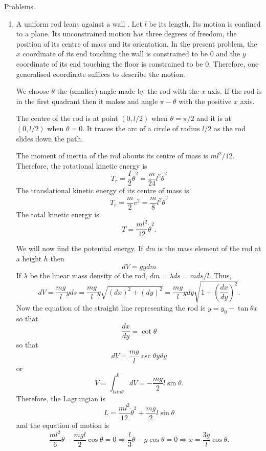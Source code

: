 Problems.
\begin{enumerate}
\item A uniform rod leans against a wall \cite[Problem 1, chapter 4]{akr}.
Let $l$ be its length. Its motion is confined to a plane. Its unconstrained
motion has three degrees of freedom, the position of its centre of mass and
its orientation. In the present problem, the $x$ coordinate of its end
touching the wall is constrained to be $0$ and the $y$ coordinate of its 
end touching the floor is constrained to be $0$. Therefore, one generalised
coordinate suffices to describe the motion. 

We choose $\theta$ the (smaller) angle made by the rod with the $x$ axis. If
the rod is in the first quadrant then it makes and angle $\pi -\theta$ with
the positive $x$ axis.

The centre of the rod is at point $(0, l/2)$ when $\theta = \pi/2$ and it is
at $(0, l/2)$ when $\theta = 0$. It traces the arc of a circle of radius
$l/2$ as the rod slides down the path.

The moment of inertia of the rod abouts its centre of mass is $ml^2/12$. 
Therefore, the rotational kinetic energy is
\[
T_r = \frac{I}{2}\dot{\theta}^2 = \frac{m}{24}l^2\dot{\theta}^2
\]
The translational kinetic energy of its centre of mass is
\[
T_c = \frac{m}{2}v^2 = \frac{m}{8}l^2\dot{\theta}^2
\]
The total kinetic energy is 
\[
T = \frac{ml^2}{12}\dot{\theta}^2.
\]

We will now find the potential energy. If $dm$ is the mass element of the
rod at a height $h$ then
\[
dV = gy dm
\]
If $\lambda$ be the linear mass density of the rod, $dm = \lambda ds = mds/l$.
Thus,
\[
dV = \frac{mg}{l} yds = \frac{mg}{l}y \sqrt{(dx)^2 + (dy)^2} = 
\frac{mg}{l}ydy\sqrt{1 + \left(\frac{dx}{dy}\right)^2}.
\]
Now the equation of the straight line representing the rod is $y = y_0 -
\tan\theta x$ so that 
\[
\frac{dx}{dy} = \cot\theta
\]
so that
\[
dV = \frac{mg}{l}\csc\theta ydy
\]
or
\[
V = \int_{lsin\theta}^0 dV = -\frac{mg}{2}l\sin\theta.
\]
Therefore, the Lagrangian is
\[
L = \frac{ml^2}{12}\dot{\theta}^2 + \frac{mg}{2}l\sin\theta
\]
and the equation of motion is
\[
\frac{ml^2}{6}\ddot{\theta} - \frac{mgl}{2}\cos\theta = 0 \Rightarrow
\frac{l}{3}\ddot{\theta} - g\cos\theta = 0 \Rightarrow \ddot{x} = 
\frac{3g}{l}\cos\theta.
\]


\end{enumerate}

